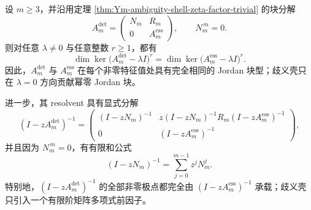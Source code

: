 \begin{theorem}\label{thm:conclusion-det-fischer-nonzero-jordan-transparent}
设 \(m\ge 3\)，并沿用定理 \ref{thm:Ym-ambiguity-shell-zeta-factor-trivial} 的块分解
\[
A_m^{\mathrm{det}}
=
\begin{pmatrix}
N_m & R_m\\
0 & A_m^{\mathrm{ess}}
\end{pmatrix},
\qquad
N_m^{\,m}=0.
\]
则对任意 \(\lambda\neq 0\) 与任意整数 \(r\ge 1\)，都有
\[
\dim\ker\bigl(A_m^{\mathrm{det}}-\lambda I\bigr)^r
=
\dim\ker\bigl(A_m^{\mathrm{ess}}-\lambda I\bigr)^r.
\]
因此，\(A_m^{\mathrm{det}}\) 与 \(A_m^{\mathrm{ess}}\) 在每个非零特征值处具有完全相同的 Jordan 块型；歧义壳只在 \(\lambda=0\) 方向贡献幂零 Jordan 块。

进一步，其 resolvent 具有显式分解
\[
(I-zA_m^{\mathrm{det}})^{-1}
=
\begin{pmatrix}
(I-zN_m)^{-1} &
z(I-zN_m)^{-1}R_m(I-zA_m^{\mathrm{ess}})^{-1}\\
0 &
(I-zA_m^{\mathrm{ess}})^{-1}
\end{pmatrix},
\]
并且因为 \(N_m^{\,m}=0\)，有有限和公式
\[
(I-zN_m)^{-1}=\sum_{j=0}^{m-1} z^j N_m^j.
\]
特别地，\((I-zA_m^{\mathrm{det}})^{-1}\) 的全部非零极点都完全由 \((I-zA_m^{\mathrm{ess}})^{-1}\) 承载；歧义壳只引入一个有限阶矩阵多项式前因子。
\end{theorem}
